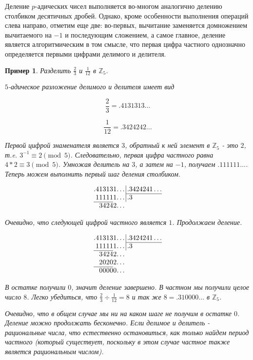 \documentclass[master, och, diploma, times]{sty/SCWorks}
\theoremstyle{plain}
\newtheorem{exmp}{Пример}[section]
\theoremstyle{definition}
\begin{document}
Деление $p$-адических чисел выполняется во-многом аналогично делению столбиком десятичных дробей. Однако, кроме особенности выполнения операций слева направо, отметим еще две: во-первых, вычитание заменяется домножением вычитаемого на $-1$ и последующим сложением, а самое главное, деление является алгоритмическим в том смысле, что первая цифра частного однозначно определяется первыми цифрами делимого и делителя.

\begin{exmp}
Разделить $\frac{2}{3}$ и $\frac{1}{12}$ в $\mathbb{Z}_5$.

\noindent $5$-адическое разложение делимого и делителя имеет вид

$$
\frac{2}{3}=.4131313\dots
$$

$$
\frac{1}{12}=.3424242\dots
$$

\noindent Первой цифрой знаменателя является $3$, обратный к ней элемент в $\mathbb{Z}_5$ - это $2$, т.e. $3^{-1} \equiv 2 \pmod 5$. Следовательно, первая цифра частного равна \mbox{$4*2 \equiv 3 \pmod 5$}. Умножая делитель на $3$, а затем на $-1$, получаем $.111111\dots$. Теперь можем выполнить первый шаг деления столбиком.

$$
\arraycolsep=0.01em
\begin{array}{rrrrrrrr@{\,}r|l}
.&4&1&3&1&3&1&\dots&&\,.3424241\dots\\
\cline{10-10}
&1&1&1&1&1&1&\dots&&\,.3\\
\cline{1-6}
&&3&4&2&4&2&\dots
\end{array}
$$

\noindent Очевидно, что следующей цифрой частного является $1$. Продолжаем деление.

$$
\arraycolsep=0.01em
\begin{array}{rrrrrrrr@{\,}r|l}
.&4&1&3&1&3&1&\dots&&\,.3424241\dots\\
\cline{10-10}
&1&1&1&1&1&1&\dots&&\,.3\\
\cline{1-6}
&&3&4&2&4&2&\dots \\
&&2&0&2&0&2&\dots \\
\cline{1-6}
&&0&0&0&0&0&\dots
\end{array}
$$

\noindent В остатке получили $0$, значит деление завершено. В частном мы получили целое число $8$. Легко убедиться, что $\frac{2}{3} \div \frac{1}{12}=8$ и так же $8=.310000\dots$ в $\mathbb{Z}_5$.

Очевидно, что в общем случае мы ни на каком шаге не получим в остатке $0$. Деление можно продолжать бесконечно. Если делимое и делитель - рациональные числа, что естественно остановиться, как только найдем период частного (который существует, поскольку в этом случае частное также является рациональным числом).


\end{exmp}
\end{document}
